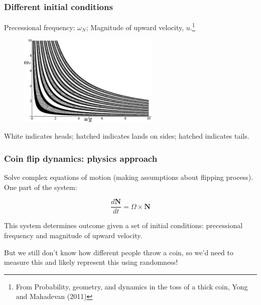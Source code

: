 \documentclass[handout]{beamer}
\begin{document}
\begin{frame}
	\frametitle{Different initial conditions}
	
	Precessional frequency: $\omega_N$; Magnitude of upward velocity, $u$.\footnote{\tiny From Probability, geometry, and dynamics in the toss of a thick coin, Yong and Mahadevan (2011)}
	
	\begin{figure}[ht]
		\centerline{\includegraphics[width=0.6\textwidth]{../figures/coin_toss.pdf}}
	\end{figure}
	
	White indicates heads; hatched indicates lands on sides; hatched indicates tails.
	
\end{frame}

\begin{frame}
	\frametitle{Coin flip dynamics: physics approach}
	
	Solve complex equations of motion (making assumptions about flipping process). One part of the system:
	
	\begin{equation}
	\frac{d\boldsymbol{N}}{dt} = \Omega \times \boldsymbol{N}
	\end{equation}
	
	This system determines outcome given a set of initial conditions: precessional frequency and magnitude of upward velocity.
	
	\vspace{0.5cm}
	But we still don't know how different people throw a coin, so we'd need to measure this and likely represent this using randomness!
	
\end{frame}
\end{document}
